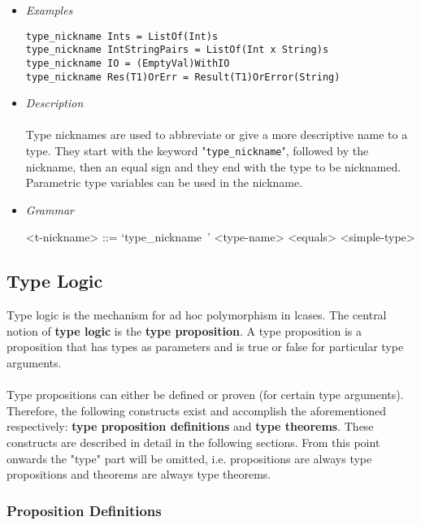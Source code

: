 \documentclass{article}
\begin{document}
\begin{itemize}

\item \textit{Examples}

\begin{verbatim}
type_nickname Ints = ListOf(Int)s
type_nickname IntStringPairs = ListOf(Int x String)s
type_nickname IO = (EmptyVal)WithIO
type_nickname Res(T1)OrErr = Result(T1)OrError(String)
\end{verbatim}

\item \textit{Description} \\\\
Type nicknames are used to abbreviate or give a more descriptive name to a
type.  They start with the keyword "\verb|type_nickname|", followed by the
nickname, then an equal sign and they end with the type to be nicknamed.
Parametric type variables can be used in the nickname.

\item \textit{Grammar}

\begin{grammar}
<t-nickname> ::=
`type_nickname\ ' <type-name> <equals> <simple-type>
\end{grammar}

\end{itemize}

\subsection{Type Logic}
\label{subsec:typelogic}

Type logic is the mechanism for ad hoc polymorphism in lcases. The central
notion of \textbf{type logic} is the \textbf{type proposition}. A type
proposition is a proposition that has types as parameters and is true or false
for particular type arguments.
\\\\
Type propositions can either be defined or proven (for certain type arguments).
Therefore, the following constructs exist and accomplish the aforementioned
respectively: \textbf{type proposition definitions} and \textbf{type theorems}.
These constructs are described in detail in the following sections. From this
point onwards the "type" part will be omitted, i.e. propositions are always
type propositions and theorems are always type theorems.

\subsubsection{Proposition Definitions}
\end{document}
